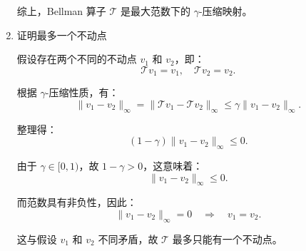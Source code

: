 \documentclass{article}
\begin{document}
\begin{enumerate}[label=(\alph*), start=1]
    综上，Bellman 算子 \(\mathcal{T}\) 是最大范数下的 \(\gamma\)-压缩映射。
    
    \item 证明最多一个不动点
    
    假设存在两个不同的不动点 $v_1$ 和 $v_2$，即：
    \[
    \mathcal{T}v_1 = v_1, \quad \mathcal{T}v_2 = v_2.
    \]
    
    根据 $\gamma$-压缩性质，有：
    \[
    \|v_1 - v_2\|_\infty = \|\mathcal{T}v_1 - \mathcal{T}v_2\|_\infty \leq \gamma \|v_1 - v_2\|_\infty.
    \]
    
    整理得：
    \[
    (1 - \gamma)\|v_1 - v_2\|_\infty \leq 0.
    \]
    
    由于 $\gamma \in [0,1)$，故 $1 - \gamma > 0$，这意味着：
    \[
    \|v_1 - v_2\|_\infty \leq 0.
    \]
    
    而范数具有非负性，因此：
    \[
    \|v_1 - v_2\|_\infty = 0 \quad \Rightarrow \quad v_1 = v_2.
    \]
    
    这与假设 $v_1$ 和 $v_2$ 不同矛盾，故 $\mathcal{T}$ 最多只能有一个不动点。
\end{enumerate}
\end{document}
